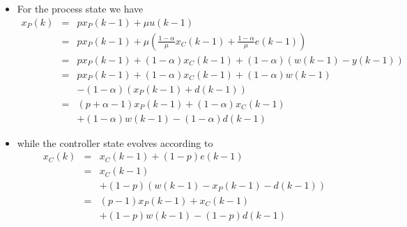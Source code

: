 \begin{frame}
\myPause
 \begin{itemize}[<+-| alert@+>]
 \item For the process state we have
       \begin{displaymath}
        \begin{array}{rcl}
         x_P(k) &=& p x_P(k-1) + \mu u(k-1) \\
                &=& p x_P(k-1) + \mu \left( \frac{1-\alpha}{\mu} x_C(k-1) + \frac{1-\alpha}{\mu} e(k-1) \right) \\
                &=& p x_P(k-1) + (1-\alpha)x_C(k-1) + (1-\alpha) \left( w(k-1)-y(k-1) \right) \\
                &=& p x_P(k-1) + (1-\alpha)x_C(k-1) + (1-\alpha) w(k-1)\\
                & & - (1-\alpha) \left( x_P(k-1)+d(k-1) \right) \\
                &=& \left( p+\alpha-1 \right) x_P(k-1)
                    +(1-\alpha) x_C(k-1)\\
                & & +(1-\alpha) w(k-1)
                    -(1-\alpha) d(k-1)                 
        \end{array}
       \end{displaymath}
 \item while the controller state evolves according to
       \begin{displaymath}
        \begin{array}{rcl}
         x_C(k) &=& x_C(k-1) + (1-p) e(k-1) \\
                &=& x_C(k-1)\\
                & & + (1-p) \left( w(k-1)-x_P(k-1)-d(k-1) \right)\\
                &=& (p-1) x_P(k-1) + x_C(k-1)\\
                & & +(1-p) w(k-1)
                    -(1-p) d(k-1)  
        \end{array}
       \end{displaymath}
 \end{itemize}
\end{frame}

